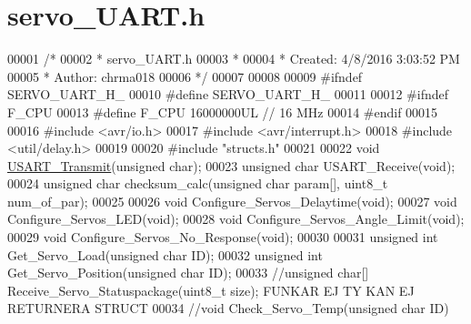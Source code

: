 \hypertarget{servo___u_a_r_t_8h_source}{}\section{servo\+\_\+\+U\+A\+R\+T.\+h}
\label{servo___u_a_r_t_8h_source}

\begin{DoxyCode}
00001 \textcolor{comment}{/*}
00002 \textcolor{comment}{ * servo\_UART.h}
00003 \textcolor{comment}{ *}
00004 \textcolor{comment}{ * Created: 4/8/2016 3:03:52 PM}
00005 \textcolor{comment}{ *  Author: chrma018}
00006 \textcolor{comment}{ */} 
00007 
00008 
00009 \textcolor{preprocessor}{#ifndef SERVO\_UART\_H\_}
00010 \textcolor{preprocessor}{#define SERVO\_UART\_H\_}
00011 
00012 \textcolor{preprocessor}{#ifndef F\_CPU}
00013 \textcolor{preprocessor}{#define F\_CPU 16000000UL        // 16 MHz}
00014 \textcolor{preprocessor}{#endif}
00015 
00016 \textcolor{preprocessor}{#include <avr/io.h>}
00017 \textcolor{preprocessor}{#include <avr/interrupt.h>}
00018 \textcolor{preprocessor}{#include <util/delay.h>}
00019 
00020 \textcolor{preprocessor}{#include "structs.h"}
00021 
00022 \textcolor{keywordtype}{void} \hyperlink{_u_s_a_r_t_8h_ab8c416106cf1aff4ccdb3da4860fc179}{USART\_Transmit}(\textcolor{keywordtype}{unsigned} \textcolor{keywordtype}{char});
00023 \textcolor{keywordtype}{unsigned} \textcolor{keywordtype}{char} USART\_Receive(\textcolor{keywordtype}{void});
00024 \textcolor{keywordtype}{unsigned} \textcolor{keywordtype}{char} checksum\_calc(\textcolor{keywordtype}{unsigned} \textcolor{keywordtype}{char} param[], uint8\_t num\_of\_par);
00025 
00026 \textcolor{keywordtype}{void} Configure\_Servos\_Delaytime(\textcolor{keywordtype}{void});
00027 \textcolor{keywordtype}{void} Configure\_Servos\_LED(\textcolor{keywordtype}{void});
00028 \textcolor{keywordtype}{void} Configure\_Servos\_Angle\_Limit(\textcolor{keywordtype}{void});
00029 \textcolor{keywordtype}{void} Configure\_Servos\_No\_Response(\textcolor{keywordtype}{void});
00030 
00031 \textcolor{keywordtype}{unsigned} \textcolor{keywordtype}{int} Get\_Servo\_Load(\textcolor{keywordtype}{unsigned} \textcolor{keywordtype}{char} ID);
00032 \textcolor{keywordtype}{unsigned} \textcolor{keywordtype}{int} Get\_Servo\_Position(\textcolor{keywordtype}{unsigned} \textcolor{keywordtype}{char} ID);
00033 \textcolor{comment}{//unsigned char[] Receive\_Servo\_Statuspackage(uint8\_t size); FUNKAR EJ TY KAN EJ RETURNERA STRUCT}
00034 \textcolor{comment}{//void Check\_Servo\_Temp(unsigned char ID)}

\end{DoxyCode}
